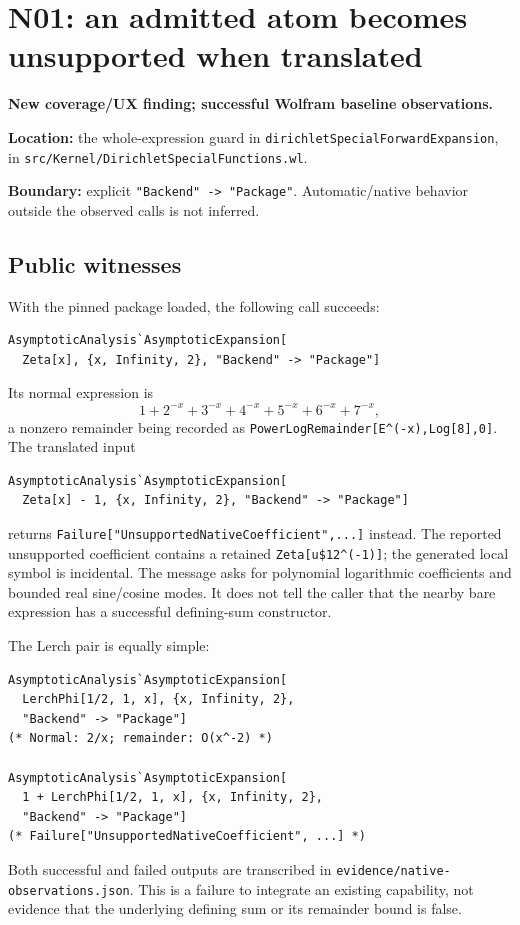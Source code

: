 \documentclass[11pt,letterpaper]{article}
\newcommand{\code}[1]{\nolinkurl{#1}}
\begin{document}
\section{N01: an admitted atom becomes unsupported when translated}
\begin{finding}
\textbf{New coverage/UX finding; successful Wolfram baseline observations.}\par
\textbf{Location:} the whole-expression guard in
\code{dirichletSpecialForwardExpansion}, in
\code{src/Kernel/DirichletSpecialFunctions.wl}.\par
\textbf{Boundary:} explicit \code{"Backend" -> "Package"}. Automatic/native
behavior outside the observed calls is not inferred.
\end{finding}

\subsection{Public witnesses}
With the pinned package loaded, the following call succeeds:
\begin{lstlisting}
AsymptoticAnalysis`AsymptoticExpansion[
  Zeta[x], {x, Infinity, 2}, "Backend" -> "Package"]
\end{lstlisting}
Its normal expression is
\begin{equation}
 1+2^{-x}+3^{-x}+4^{-x}+5^{-x}+6^{-x}+7^{-x},
\end{equation}
a nonzero remainder being recorded as
\code{PowerLogRemainder[E^(-x),Log[8],0]}.
The translated input
\begin{lstlisting}
AsymptoticAnalysis`AsymptoticExpansion[
  Zeta[x] - 1, {x, Infinity, 2}, "Backend" -> "Package"]
\end{lstlisting}
returns \code{Failure["UnsupportedNativeCoefficient",...]} instead. The
reported unsupported coefficient contains a retained
\code{Zeta[u$12^(-1)]}; the generated local symbol is incidental. The message
asks for polynomial logarithmic coefficients and bounded real sine/cosine
modes. It does not tell the caller that the nearby bare expression has a
successful defining-sum constructor.

The Lerch pair is equally simple:
\begin{lstlisting}
AsymptoticAnalysis`AsymptoticExpansion[
  LerchPhi[1/2, 1, x], {x, Infinity, 2},
  "Backend" -> "Package"]
(* Normal: 2/x; remainder: O(x^-2) *)

AsymptoticAnalysis`AsymptoticExpansion[
  1 + LerchPhi[1/2, 1, x], {x, Infinity, 2},
  "Backend" -> "Package"]
(* Failure["UnsupportedNativeCoefficient", ...] *)
\end{lstlisting}
Both successful and failed outputs are transcribed in
\code{evidence/native-observations.json}. This is a failure to integrate an
existing capability, not evidence that the underlying defining sum or its
remainder bound is false.
\end{document}
